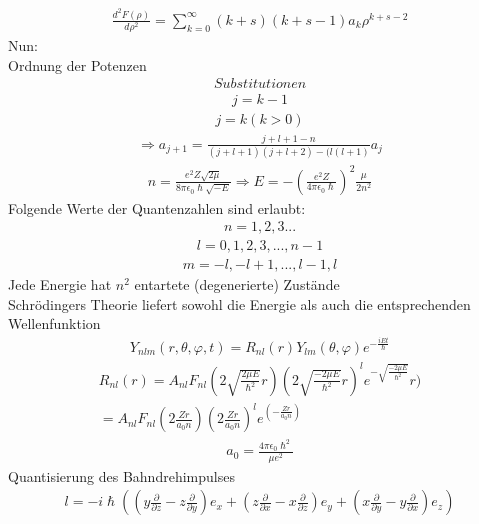\documentclass[10pt,a4paper]{article}
\begin{document}
\begin{align}
\frac{d^2F(\rho)}{d\rho^2}= \sum_{k=0}^\infty (k+s)(k+s-1) a_k \rho^{k+s-2}
\end{align}
Nun:\\
Ordnung der Potenzen\\
\begin{align}
Substitutionen
\end{align}
\begin{align}
j=k-1
\end{align}
\begin{align}
j=k (k>0)
\end{align}
\begin{align}
\Rightarrow a_{j+1}=\frac{j+l+1-n}{(j+l+1)(j+l+2)-(l(l+1)} a_j
\end{align}
\begin{align}
n=\frac{e^2 Z \sqrt{2 \mu}}{8 \pi \epsilon_0 \hslash \sqrt{-E}} \Rightarrow E=-(\frac{e^2 Z}{4 \pi \epsilon_0 \hslash})^2 \frac{\mu}{2n^2}
\end{align}
Folgende Werte der Quantenzahlen sind erlaubt:
\begin{align}
n=1,2,3...
\end{align}
\begin{align}
l=0,1,2,3,...,n-1
\end{align}
\begin{align}
m=-l,-l+1,...,l-1,l
\end{align}
Jede Energie hat $n^2$ entartete (degenerierte) Zustände\\
Schrödingers Theorie liefert sowohl die Energie als auch die entsprechenden Wellenfunktion
\begin{align}
Y_{nlm}(r,\theta,\varphi,t)=R_{nl} (r) Y_{lm} (\theta,\varphi) e^{-\frac{iEt}{\hslash}}
\end{align}
\begin{align}
R_{nl}(r)=A_{nl}F_{nl}(2\sqrt{\frac{2 \mu E}{\hslash^2}}r)(2\sqrt{\frac{-2 \mu E}{\hslash^2}}r)^le^{-\sqrt{\frac{-2 \mu E}{\hslash^2}}}r)\\
= A_{nl}F_{nl}(2\frac{Zr}{a_0 n})(2\frac{Zr}{a_0 n})^le^({-\frac{Zr}{a_0 n}})
\end{align}
\begin{align}
a_0=\frac{4 \pi \epsilon_0 \hslash^2}{\mu e^2}
\end{align}
Quantisierung des Bahndrehimpulses
\begin{align}
l=-i \hslash ((y \frac{\partial}{\partial z}-z \frac{\partial}{\partial y})e_x+(z \frac{\partial}{\partial x}-x \frac{\partial}{\partial z})e_y+(x \frac{\partial}{\partial y}-y \frac{\partial}{\partial x})e_z)
\end{align}
\end{document}

